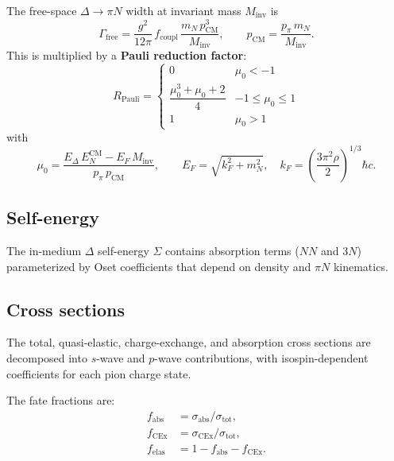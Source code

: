 \documentclass[11pt,a4paper]{article}
\begin{document}
The free-space $\Delta \to \pi N$ width at invariant mass $M_{\text{inv}}$ is
\begin{equation}
  \Gamma_{\text{free}}
  = \frac{g^{2}}{12\pi}\,f_{\text{coupl}}\,\frac{m_{N}\,p_{\text{CM}}^{3}}{M_{\text{inv}}},
  \qquad
  p_{\text{CM}} = \frac{p_{\pi}\,m_{N}}{M_{\text{inv}}}.
\end{equation}
This is multiplied by a \textbf{Pauli reduction factor}:
\begin{equation}
  R_{\text{Pauli}}
  = \begin{cases}
      0 & \mu_{0} < -1 \\[4pt]
      \dfrac{\mu_{0}^{3} + \mu_{0} + 2}{4} & -1 \le \mu_{0} \le 1 \\[4pt]
      1 & \mu_{0} > 1
    \end{cases}
\end{equation}
with
\begin{equation}
  \mu_{0}
  = \frac{E_{\Delta}\,E_{N}^{\text{CM}} - E_{F}\,M_{\text{inv}}}
         {p_{\pi}\,p_{\text{CM}}},
  \qquad
  E_{F} = \sqrt{k_{F}^{2} + m_{N}^{2}},
  \quad
  k_{F} = \left(\frac{3\pi^{2}\rho}{2}\right)^{\!1/3}\!\!\hbar c.
\end{equation}

\subsection{Self-energy}

The in-medium $\Delta$ self-energy $\Sigma$ contains absorption terms
($NN$ and $3N$) parameterized by Oset coefficients that depend on
density and $\pi N$ kinematics.

\subsection{Cross sections}

The total, quasi-elastic, charge-exchange, and absorption cross sections
are decomposed into $s$-wave and $p$-wave contributions, with
isospin-dependent coefficients for each pion charge state.

The fate fractions are:
\begin{align}
  f_{\text{abs}} &= \sigma_{\text{abs}} / \sigma_{\text{tot}}, \\
  f_{\text{CEx}} &= \sigma_{\text{CEx}} / \sigma_{\text{tot}}, \\
  f_{\text{elas}} &= 1 - f_{\text{abs}} - f_{\text{CEx}}.
\end{align}
\end{document}
